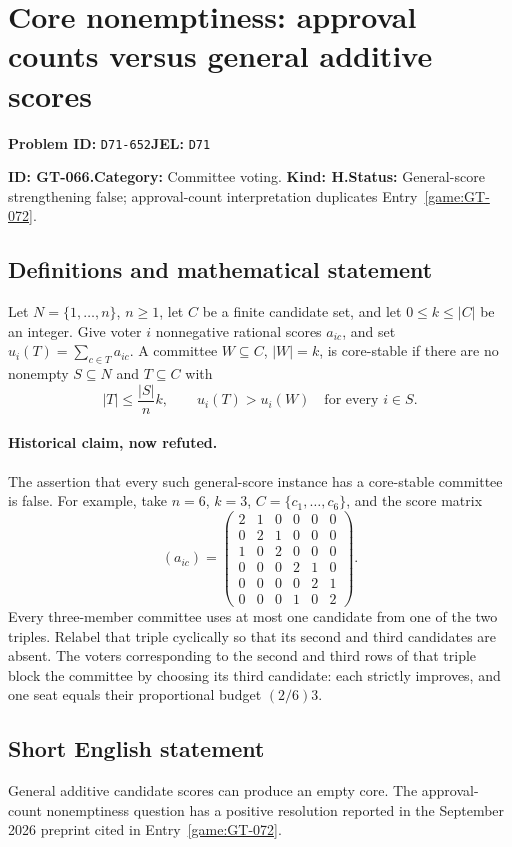 \documentclass[11pt,a4paper]{article}
\begin{document}
\section*{Core nonemptiness: approval counts versus general additive scores}
\textbf{Problem ID:} \texttt{D71-652}\quad \textbf{JEL:} \texttt{D71}\par
\label{problem:OP-0196}
\label{game:GT-066}
{\sffamily\small\color{muted}
\noindent\textbf{ID: GT-066.}\quad\textbf{Category:} Committee voting.
\quad\textbf{Kind: H.}\quad\textbf{Status:} General-score strengthening false;
approval-count interpretation duplicates Entry~\ref{game:GT-072}.
\par}
\subsection*{Definitions and mathematical statement}
Let \(N=\{1,\ldots,n\}\), \(n\geq 1\), let \(C\) be a finite candidate
set, and let \(0\leq k\leq |C|\) be an integer.
Give voter \(i\) nonnegative rational scores \(a_{ic}\), and set
\(u_i(T)=\sum_{c\in T}a_{ic}\).
A committee \(W\subseteq C\), \(|W|=k\), is core-stable if there are no
nonempty \(S\subseteq N\) and \(T\subseteq C\) with
\[
 |T|\leq \frac{|S|}{n}k,\qquad
 u_i(T)>u_i(W)\quad\text{for every }i\in S.
\]

\paragraph{Historical claim, now refuted.}
The assertion that every such general-score instance has a core-stable
committee is false. For example, take \(n=6\), \(k=3\),
\(C=\{c_1,\ldots,c_6\}\), and the score matrix
\[
 (a_{ic})=
 \begin{pmatrix}
 2&1&0&0&0&0\\
 0&2&1&0&0&0\\
 1&0&2&0&0&0\\
 0&0&0&2&1&0\\
 0&0&0&0&2&1\\
 0&0&0&1&0&2
 \end{pmatrix}.
\]
Every three-member committee uses at most one candidate from one of the
two triples. Relabel that triple cyclically so that its second and third
candidates are absent. The voters corresponding to the second and third
rows of that triple block the committee by choosing its third candidate:
each strictly improves, and one seat equals their proportional budget
\((2/6)3\).

\subsection*{Short English statement}
General additive candidate scores can produce an empty core.
The approval-count nonemptiness question has a positive resolution reported
in the September 2026 preprint cited in Entry~\ref{game:GT-072}.
\end{document}
